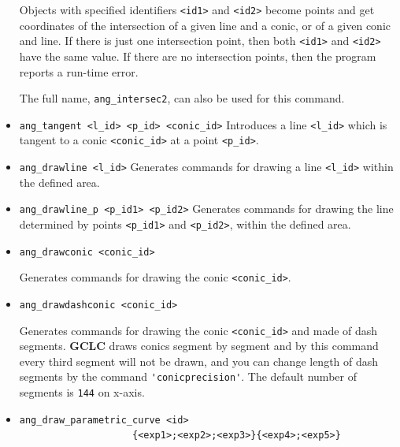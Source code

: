 \documentclass[a4paper]{book}
\newcommand{\gclc}{{\bfseries GCLC}\xspace}
\begin{document}
\begin{itemize}
        Objects with specified identifiers \verb|<id1>| and
        \verb|<id2>| become {\sc point}s and get coordinates of the
        intersection of a given line and a conic, or of a given conic
        and line. If there is just one intersection point, then both
        \verb|<id1>| and \verb|<id2>| have the same
        value. If there are no intersection points, then the program
        reports a run-time error.

        The full name, \verb|ang_intersec2|, can also be used for this command.

\item \verb|ang_tangent <l_id> <p_id> <conic_id>|
        Introduces a line \verb|<l_id>| which is tangent to
        a conic \verb|<conic_id>| at a point \verb|<p_id>|.

\item
\verb|ang_drawline <l_id>|
        Generates commands for drawing a line \verb|<l_id>|
        within the defined area.

\item
\verb|ang_drawline_p <p_id1> <p_id2>|
        Generates commands for drawing the line determined by
        points \verb|<p_id1>| and \verb|<p_id2>|,
        within the defined area.

\item \verb|ang_drawconic <conic_id>|

        Generates commands for drawing the conic  \verb|<conic_id>|.

\item \verb|ang_drawdashconic <conic_id>|

        Generates commands for drawing the conic \verb|<conic_id>|
        and made of dash segments. \gclc draws conics segment
        by segment and by this command every third segment will not
        be drawn, and you can change length of dash segments by
        the command \verb|'conicprecision'|.
        The default number of segments is \verb|144| on x-axis.

\item
\verb|ang_draw_parametric_curve <id>| \\
\verb|                    {<exp1>;<exp2>;<exp3>}{<exp4>;<exp5>}|


\end{itemize}
\end{document}
